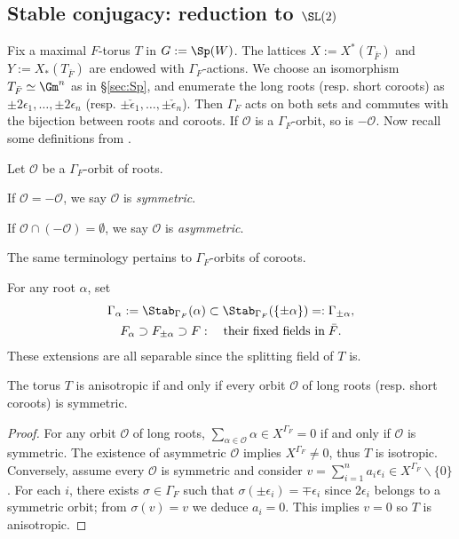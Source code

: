 \documentclass[a4paper,10pt]{article}
\begin{document}
\subsection{Stable conjugacy: reduction to \texorpdfstring{$\SL(2)$}{SL2}}\label{sec:stable-reduction}
Fix a maximal $F$-torus $T$ in $G := \Sp(W)$. The lattices $X := X^*\left( T_{\bar{F}} \right)$ and $Y := X_*\left( T_{\bar{F}} \right)$ are endowed with $\Gamma_F$-actions. We choose an isomorphism $T_{\bar{F}} \simeq \Gm^n$ as in \S\ref{sec:Sp}, and enumerate the long roots (resp. short coroots) as $\pm 2\epsilon_1, \ldots, \pm 2\epsilon_n$ (resp. $\pm \check{\epsilon}_1, \ldots, \pm \check{\epsilon}_n$). Then $\Gamma_F$ acts on both sets and commutes with the bijection between roots and coroots. If $\mathcal{O}$ is a $\Gamma_F$-orbit, so is $-\mathcal{O}$. Now recall some definitions from \cite[\S 2]{LS1}.

\begin{definition}\label{def:symmetric-orbits}
	Let $\mathcal{O}$ be a $\Gamma_F$-orbit of roots.
	\begin{compactenum}[(i)]
		\item If $\mathcal{O}=-\mathcal{O}$, we say $\mathcal{O}$ is \emph{symmetric}.
		\item If $\mathcal{O} \cap (-\mathcal{O}) = \emptyset$, we say $\mathcal{O}$ is \emph{asymmetric}.
	\end{compactenum}
	The same terminology pertains to $\Gamma_F$-orbits of coroots.
\end{definition}
For any root $\alpha$, set
\begin{equation}\label{eqn:F_alpha}\begin{gathered}
	\Gamma_\alpha := \Stab_{\Gamma_F}(\alpha) \subset \Stab_{\Gamma_F}(\{\pm\alpha\}) =: \Gamma_{\pm\alpha}, \\
	F_\alpha \supset F_{\pm\alpha} \supset F: \quad \text{their fixed fields in}\; \bar{F}.
\end{gathered}\end{equation}
These extensions are all separable since the splitting field of $T$ is.

\begin{lemma}\label{prop:anisotropic-criterion}
	The torus $T$ is anisotropic if and only if every orbit $\mathcal{O}$ of long roots (resp. short coroots) is symmetric.
\end{lemma}
\begin{proof}
	For any orbit $\mathcal{O}$ of long roots, $\sum_{\alpha \in \mathcal{O}} \alpha \in X^{\Gamma_F} = 0$ if and only if $\mathcal{O}$ is symmetric. The existence of asymmetric $\mathcal{O}$ implies $X^{\Gamma_F} \neq 0$, thus $T$ is isotropic. Conversely, assume every $\mathcal{O}$ is symmetric and consider $v = \sum_{i=1}^n a_i\epsilon_i \in X^{\Gamma_F} \smallsetminus \{0\}$. For each $i$, there exists $\sigma \in \Gamma_F$ such that $\sigma(\pm\epsilon_i) = \mp\epsilon_i$ since $2\epsilon_i$ belongs to a symmetric orbit; from $\sigma(v)=v$ we deduce $a_i=0$. This implies $v=0$ so $T$ is anisotropic.
\end{proof}
\end{document}
